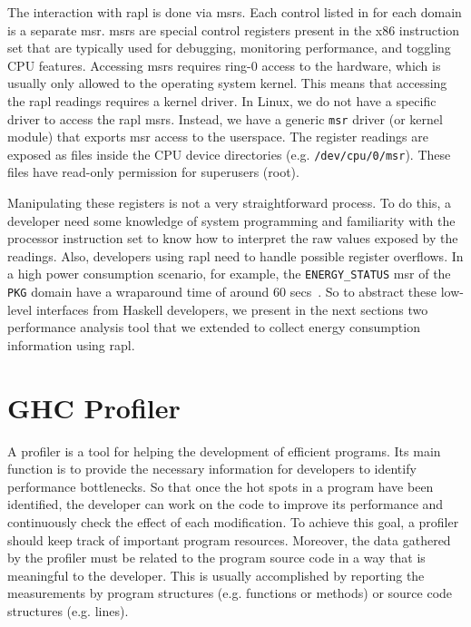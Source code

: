 The interaction with \acs{rapl} is done via \acp{msr}. Each control listed in  for each domain is a separate \ac{msr}. \acp{msr} are special control registers present in the x86 instruction set that are typically used for debugging, monitoring performance, and toggling CPU features. Accessing \acp{msr} requires ring-0 access to the hardware, which is usually only allowed to the operating system kernel. This means that accessing the \ac{rapl} readings requires a kernel driver. In Linux, we do not have a specific driver to access the \ac{rapl} \acp{msr}. Instead, we have a generic \texttt{msr} driver (or kernel module) that exports \ac{msr} access to the userspace. The register readings are exposed as files inside the CPU device directories (e.g. \texttt{/dev/cpu/0/msr}). These files have read-only permission for superusers (root).

Manipulating these registers is not a very straightforward process. To do this, a developer need some knowledge of system programming and familiarity with the processor instruction set to know how to interpret the raw values exposed by the readings. Also, developers using \ac{rapl} need to handle possible register overflows. In a high power consumption scenario, for example, the \texttt{ENERGY\_STATUS} \ac{msr} of the \texttt{PKG} domain have a wraparound time of around 60 secs~\cite[p. 2465]{intel:2016}. So to abstract these low-level interfaces from Haskell developers, we present in the next sections two performance analysis tool that we extended to collect energy consumption information using \ac{rapl}.


\section{GHC Profiler}\label{sec:profiler}
A profiler is a tool for helping the development of efficient programs. Its main function is to provide the necessary information for developers to identify performance bottlenecks. So that once the hot spots in a program have been identified, the developer can work on the code to improve its performance and continuously check the effect of each modification. To achieve this goal, a profiler should keep track of important program resources. Moreover, the data gathered by the profiler must be related to the program source code in a way that is meaningful to the developer. This is usually accomplished by reporting the measurements by program structures (e.g. functions or methods) or source code structures (e.g. lines).

